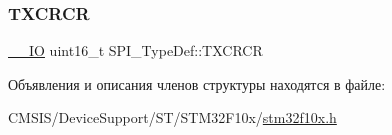 \subsubsection{\texorpdfstring{TXCRCR}{TXCRCR}}
{\footnotesize\ttfamily \mbox{\hyperlink{group___c_m_s_i_s___c_m3__core__definitions_gaec43007d9998a0a0e01faede4133d6be}{\+\_\+\+\_\+\+IO}} uint16\+\_\+t S\+P\+I\+\_\+\+Type\+Def\+::\+T\+X\+C\+R\+CR}



Объявления и описания членов структуры находятся в файле\+:\begin{DoxyCompactItemize}
\item 
C\+M\+S\+I\+S/\+Device\+Support/\+S\+T/\+S\+T\+M32\+F10x/\mbox{\hyperlink{stm32f10x_8h}{stm32f10x.\+h}}\end{DoxyCompactItemize}
